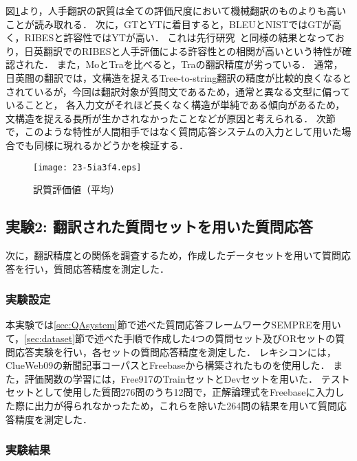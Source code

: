 \documentclass[japanese]{jnlp_1.4}
\begin{document}
図\ref{fig:mteval}より，人手翻訳の訳質は全ての評価尺度において機械翻訳のものよりも高いことが読み取れる．
次に，GTとYTに着目すると，BLEUとNISTではGTが高く，RIBESと許容性ではYTが高い．
これは先行研究~\cite{ribes}と同様の結果となっており，日英翻訳でのRIBESと人手評価による許容性との相関が高いという特性が確認された．
また，MoとTraを比べると，Traの翻訳精度が劣っている．
通常，日英間の翻訳では，文構造を捉えるTree-to-string翻訳の精度が比較的良くなるとされているが，今回は翻訳対象が質問文であるため，通常と異なる文型に偏っていることと，	各入力文がそれほど長くなく構造が単純である傾向があるため，文構造を捉える長所が生かされなかったことなどが原因と考えられる．
次節で，このような特性が人間相手ではなく質問応答システムの入力として用いた場合でも同様に現れるかどうかを検証する．

\begin{figure}[t]
\begin{center}
\texttt{[image: 23-5ia3f4.eps]}
\end{center}
\caption{訳質評価値（平均）}
\label{fig:mteval}
\vspace{1\Cvs}
\end{figure}


\subsection{実験2: 翻訳された質問セットを用いた質問応答}
\label{sec:QAexp}

次に，翻訳精度との関係を調査するため，作成したデータセットを用いて質問応答を行い，質問応答精度を測定した．


\subsubsection{実験設定}

本実験では\ref{sec:QAsystem}節で述べた質問応答フレームワークSEMPREを用いて，\ref{sec:dataset}節で述べた手順で作成した4つの質問セット及びORセットの質問応答実験を行い，各セットの質問応答精度を測定した．
レキシコンには，ClueWeb09の新聞記事コーパスとFreebaseから構築されたものを使用した．
また，評価関数の学習には，Free917のTrainセットとDevセットを用いた．
テストセットとして使用した質問276問のうち12問で，正解論理式をFreebaseに入力した際に出力が得られなかったため，これらを除いた264問の結果を用いて質問応答精度を測定した．


\subsubsection{実験結果}
\label{sec:QAexpresult}
\end{document}
